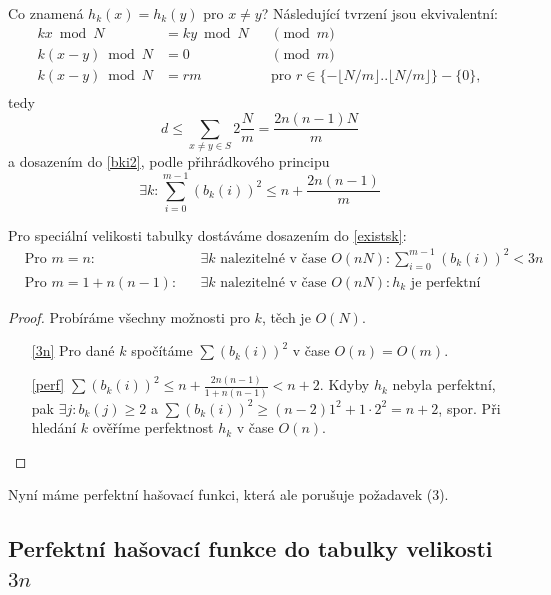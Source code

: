 Co znamená $h_k(x) = h_k(y)$ pro $x \neq y$? Následující tvrzení jsou
ekvivalentní:
\begin{align*}
kx \bmod N & = ky \bmod N && \pmod m\\
k(x-y) \bmod N & = 0 && \pmod m\\
k(x-y) \bmod N & = r m && \text{pro } r \in 
	\{ - \lfloor N/m \rfloor .. \lfloor N/m \rfloor \} - \{0\}, \\
\end{align*}
tedy
\[
d \leq \sum_{x \neq y \in S} 2 \frac Nm = \frac{2 n(n-1) N}m
\]
a dosazením do \eqref{bki2}, podle přihrádkového principu
\begin{equation}
\label{existsk}
\exists k : \sum_{i=0}^{m-1} ( b_k(i) )^2 \leq n + \frac{2 n(n-1)}m
\end{equation}

Pro speciální velikosti tabulky dostáváme dosazením do \eqref{existsk}:
\begin{align}
\label{3n}
&\text{Pro } m = n: 
&& \exists k \text{ nalezitelné v čase }O(nN): 
\sum_{i=0}^{m-1} ( b_k(i) )^2 < 3n\\
\label{perf}
&\text{Pro } m = 1 + n(n-1): 
&& \exists k \text{ nalezitelné v čase }O(nN):  
h_k \text{ je perfektní} 
\end{align}

\begin{proof}
Probíráme všechny možnosti pro $k$, těch je $O(N)$.
\begin{enumerate}
\item[\eqref{3n}]
Pro dané $k$ spočítáme $\sum ( b_k(i) )^2$ v čase $O(n) = O(m)$.
\item[\eqref{perf}]
$\sum ( b_k(i) )^2 \leq n + \frac{2 n(n-1)}{1+ n(n-1)} < n + 2$.
Kdyby $h_k$ nebyla perfektní, pak 
$\exists j : b_k(j) \geq 2$
a
$\sum ( b_k(i) )^2 \geq (n-2) 1^2 + 1 \cdot 2^2 = n + 2$,
spor.
Při hledání $k$ ověříme perfektnost $h_k$ v čase $O(n)$.
\end{enumerate}
\end{proof}

Nyní máme perfektní hašovací funkci, která ale porušuje požadavek (3).
\subsection{Perfektní hašovací funkce do tabulky velikosti $3n$}

